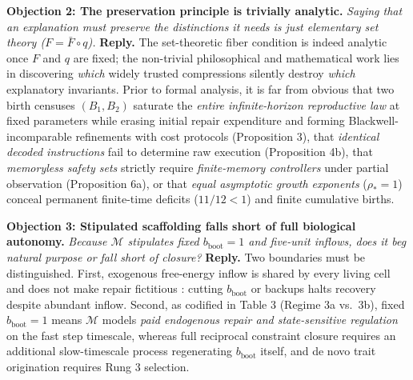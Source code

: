 \documentclass[11pt,a4paper]{article}
\begin{document}
\textbf{Objection 2: The preservation principle is trivially analytic.}
\emph{Saying that an explanation must preserve the distinctions it needs
is just elementary set theory (\(F = \bar{F} \circ q\)).}
\textbf{Reply.} The set-theoretic fiber condition is indeed analytic
once \(F\) and \(q\) are fixed; the non-trivial philosophical and
mathematical work lies in discovering \emph{which} widely trusted
compressions silently destroy \emph{which} explanatory invariants. Prior
to formal analysis, it is far from obvious that two birth censuses
\((B_1, B_2)\) saturate the \emph{entire infinite-horizon reproductive
law} at fixed parameters while erasing initial repair expenditure and
forming Blackwell-incomparable refinements with cost protocols
(Proposition 3), that \emph{identical decoded instructions} fail to
determine raw execution (Proposition 4b), that \emph{memoryless safety
sets} strictly require \emph{finite-memory controllers} under partial
observation (Proposition 6a), or that \emph{equal asymptotic growth
exponents} (\(\rho_* = 1\)) conceal permanent finite-time deficits
(\(11/12 < 1\)) and finite cumulative births.

\textbf{Objection 3: Stipulated scaffolding falls short of full
biological autonomy.} \emph{Because \(\mathcal{M}\) stipulates fixed
\(b_{\mathrm{boot}} = 1\) and five-unit inflows, does it beg natural
purpose or fall short of closure?} \textbf{Reply.} Two boundaries must
be distinguished. First, exogenous free-energy inflow is shared by every
living cell and does not make repair fictitious
\citep{jonas1966, montevilMossio2015}: cutting \(b_{\mathrm{boot}}\) or
backups halts recovery despite abundant inflow. Second, as codified in
Table 3 (Regime 3a vs.~3b), fixed \(b_{\mathrm{boot}} = 1\) means
\(\mathcal{M}\) models \emph{paid endogenous repair and state-sensitive
regulation} on the fast step timescale, whereas full reciprocal
constraint closure requires an additional slow-timescale process
regenerating \(b_{\mathrm{boot}}\) itself, and de novo trait origination
requires Rung 3 selection.
\end{document}
